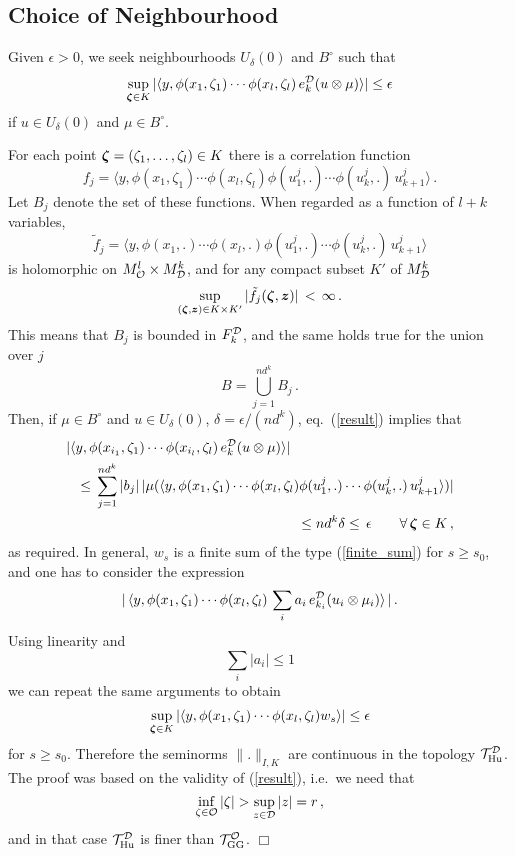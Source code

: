 \documentclass[a4paper,12pt,twoside]{article}
\renewcommand{\b}{\langle}
\renewcommand{\k}{\rangle}
\renewcommand{\v}[1]{\mbox{\boldmath $#1$}}
\renewcommand{\c}[1]{{\cal #1}}
\newcommand{\cT}{{\cal T}}
\newcommand{\qed}{\hspace{2em}$\Box$\vspace{1em}}
\newcommand{\eq}[1]{(\ref{#1})}
\renewcommand{\O}{\c{O}}
\newcommand{\D}{\c{D}}
\renewcommand{\S}{\c{S}}
\newcommand{\Hu}{{\rm Hu}}
\newcommand{\GG}{{\rm GG}}
\newcommand{\THud}{\cT_{\Hu}^{\D}}
\newcommand{\TGG}{\cT_{\GG}^{\O}}
\newcommand{\Fd}{F^{\D}_k}
\newcommand{\Md}{M^k_{\D}}
\newcommand{\Mo}{M^l_{\O}}
\newcommand{\ed}{e_k^{\D}}
\newcommand{\edi}{e_{k_i}^{\D}}
\newcommand{\Bp}{B^{\circ}}
\newcommand{\vzd}{\v{z}}
\newcommand{\vz}{\v{\zeta}}
\newcommand{\tfj}{\tilde{f}_j}
\renewcommand{\S}{\scriptstyle}
\begin{document}
\subsection*{Choice of Neighbourhood}
Given $\epsilon > 0$,
we seek neighbourhoods $U_{\delta}(0)$ and
$\Bp$ such that
$$\sup_{\v{\S\zeta}\in K}|\b y,\phi(x_1,\zeta_1)\cdots
\phi(x_l,\zeta_l)\,\ed(u\otimes\mu)\k| \le\epsilon$$
if $u\in U_{\delta}(0)$ and $\mu\in\Bp$.

For each point $\vz = (\zeta_1,\ldots,\zeta_l)\in K$ there is
a correlation function
$$f_j = \b y, \phi(x_1,\zeta_1)\cdots
\phi(x_l,\zeta_l) \phi(u^j_1,.)\cdots \phi(u^j_k,.)\,u^j_{k+1}\k\,.$$
Let $B_j$ denote the set of these functions.
When regarded
as a function of $l+k$ variables,
$$\tfj = \b y, \phi(x_1,.)\cdots
\phi(x_l,.) \phi(u^j_1,.)\cdots \phi(u^j_k,.)\,u^j_{k+1}\k$$
is holomorphic on $\Mo\times\Md$, and for any compact
subset $K'$ of $\Md$
$$\sup_{(\v{\S\zeta},\v{\S z})\in K\times K'}
|\tfj(\vz,\vzd)|\,<\,\infty\,.$$
This means that $B_j$ is bounded in $\Fd$, and the same
holds true for the union over $j$
$$B = \bigcup_{j=1}^{nd^k} B_j\,.$$
Then, if $\mu\in\Bp$ and $u\in U_{\delta}(0)$, $\delta = \epsilon/(nd^k)$,
eq.\ \eq{result} implies that
\begin{eqnarray*}
\lefteqn{|\b y,\phi(x_{i_1},\zeta_1)\cdots
\phi(x_{i_l},\zeta_l)\,\ed(u\otimes\mu)\k|} \\
&& \le\,
\sum_{j=1}^{nd^k} |b_j|\,|\mu(\b y, \phi(x_1,\zeta_1)\cdots
\phi(x_l,\zeta_l) \phi(u^j_1,.)\cdots \phi(u^j_k,.)\,u^j_{k+1}\k)| \\
&& \le nd^k\delta\le\,\epsilon\qquad\forall\,\v{\zeta}\in K\,,
\end{eqnarray*}
as required.
In general, $w_s$ is a finite sum
of the type \eq{finite_sum} for $s\ge s_0$, and one has to
consider the expression
$$|\,\b y,\phi(x_1,\zeta_1)\cdots
\phi(x_l,\zeta_l)\,\sum_i a_i\,\edi(u_i\otimes\mu_i)\k\,|\,.$$
Using linearity and
$$\sum_i |a_i| \le 1$$
we can repeat the same arguments to obtain
$$\sup_{\v{\S\zeta}\in K} |\b y,\phi(x_1,\zeta_1)\cdots
\phi(x_l,\zeta_l)w_s\k| \le \epsilon$$
for $s\ge s_0$.
Therefore the seminorms $\|.\|_{I,K}$ are continuous in the
topology $\THud$. The proof was based on the validity of \eq{result}, i.e.\ we need that
$$\inf_{\zeta\in\O} |\zeta| > \sup_{z\in\D} |z| = r\,,$$
and in that case $\THud$ is finer than $\TGG$. \qed
\end{document}

